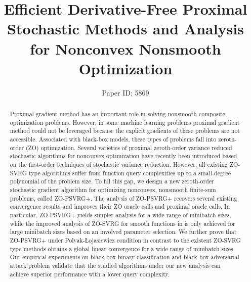 \documentclass[letterpaper]{article} %
\begin{document}
%
\title{Efficient Derivative-Free Proximal Stochastic Methods and Analysis for Nonconvex Nonsmooth Optimization}
\author{
Paper ID: 5869
}
\maketitle
\begin{abstract}
Proximal gradient method has an important role
in solving nonsmooth composite optimization problems. However, in some machine learning problems  proximal gradient method could not be leveraged because the explicit gradients of these problems are not accessible. Associated with black-box models, these  types  of  problems fall  into  zeroth-order (ZO) optimization. Several varieties of proximal zeroth-order variance reduced stochastic algorithms  for nonconvex optimization have recently been introduced  based on the first-order techniques of stochastic variance reduction. 
However, all existing ZO-SVRG type  algorithms suffer from function query complexities up  to a small-degree  polynomial  of  the  problem  size. To fill this gap, we design a new zeroth-order stochastic gradient algorithm for optimizing nonconvex, nonsmooth finite-sum problems, called ZO-PSVRG+. The analysis of ZO-PSVRG+ recovers several
existing convergence results and improves their ZO oracle calls and proximal oracle calls. In particular, ZO-PSVRG+ yields simpler analysis  for a wide range of minibatch sizes, while the improved analysis of ZO-SVRG for smooth functions in \cite{ji2019improved} is only achieved for large minibatch sizes based on an involved parameter selection. We further prove that ZO-PSVRG+ under Polyak-Łojasiewicz condition in contrast to the existent ZO-SVRG type methods obtains a global linear convergence for a wide range of minibatch sizes. Our empirical experiments on black-box binary classification and black-box adversarial attack problem
validate  that  the studied algorithms under our new analysis  can  achieve  superior performance with a lower  query complexity. 
\end{abstract}
\noindent 


\fontsize{9pt}{10.8pt} \selectfont



\onecolumn %
%
%
\end{document}
